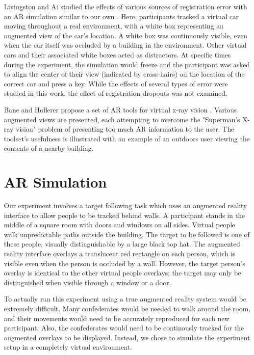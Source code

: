 \documentclass{acmsiggraph}                     %
\begin{document}
Livingston and Ai studied the effects of various sources of registration error with an AR simulation similar to our own \cite{4637329}.  Here, participants tracked a virtual car moving throughout a real environment, with a white box representing an augmented view of the car's location.  A white box was continuously visible, even when the car itself was occluded by a building in the environment.  Other virtual cars and their associated white boxes acted as distractors.  At specific times during the experiment, the simulation would freeze and the participant was asked to align the center of their view (indicated by cross-hairs) on the location of the correct car and press a key.  While the effects of several types of error were studied in this work, the effect of registration dropouts was not examined.

Bane and Hollerer propose a set of AR tools for virtual x-ray vision \cite{1383060}.  Various augmented views are presented, each attempting to overcome the "Superman's X-ray vision" problem of presenting too much AR information to the user.  The toolset's usefulness is illustrated with an example of an outdoors user viewing the contents of a nearby building.



\section{AR Simulation}

Our experiment involves a target following task which uses an augmented reality interface to allow people to be tracked behind walls.  A participant stands in the middle of a square room with doors and windows on all sides.  Virtual people walk unpredictable paths outside the building.  The target to be followed is one of these people, visually distinguishable by a large black top hat.  The augmented reality interface overlays a translucent red rectangle on each person, which is visible even when the person is occluded by a wall.  However, the target person's overlay is identical to the other virtual people overlays; the target may only be distinguished when visible through a window or a door.

To actually run this experiment using a true augmented reality system would be extremely difficult.  Many confederates would be needed to walk around the room, and their movements would need to be accurately reproduced for each new participant.  Also, the confederates would need to be continously tracked for the augmented overlays to be displayed.  Instead, we chose to simulate the experiment setup in a completely virtual environment.
\end{document}

